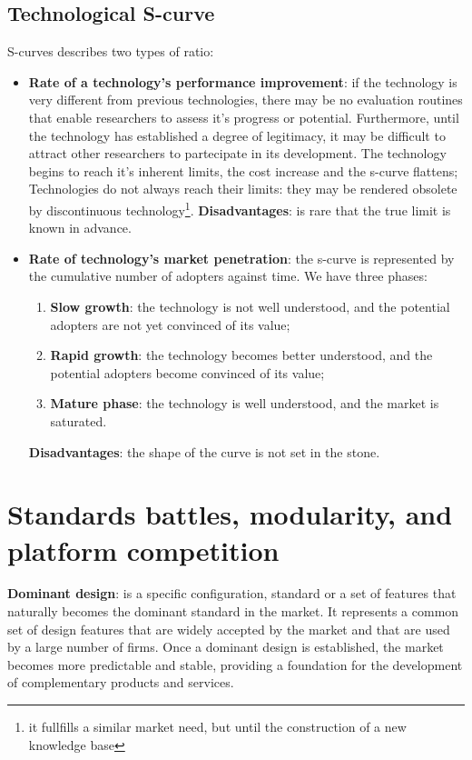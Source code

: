 \documentclass[12pt]{article}
\begin{document}
\subsection{Technological S-curve}
S-curves describes two types of ratio:
\begin{itemize}
    \item \textbf{Rate of a technology's performance improvement}: if the technology is very different from previous technologies, there may be no evaluation routines that enable researchers 
    to assess it's progress or potential. Furthermore, until the technology has established a degree of legitimacy, it may be difficult to attract other researchers to partecipate in its development.
    The technology begins to reach it's inherent limits, the cost increase and the s-curve flattens;
    Technologies do not always reach their limits: they may be rendered obsolete by discontinuous technology\footnote{it fullfills a similar market need, 
    but until the construction of a new knowledge base}.
    \textbf{Disadvantages}: is rare that the true limit is known in advance.
    \item \textbf{Rate of technology's market penetration}: the s-curve is represented by the cumulative number of adopters against time.
    We have three phases:
    \begin{enumerate}
        \item \textbf{Slow growth}: the technology is not well understood, and the potential adopters are not yet convinced of its value;
        \item \textbf{Rapid growth}: the technology becomes better understood, and the potential adopters become convinced of its value;
        \item \textbf{Mature phase}: the technology is well understood, and the market is saturated.
    \end{enumerate}
    \textbf{Disadvantages}: the shape of the curve is not set in the stone.
\end{itemize}
\section{Standards battles, modularity, and platform competition}
\textbf{Dominant design}: is a specific configuration, standard or a set of features that naturally becomes the dominant standard in the market.
It represents a common set of design features that are widely accepted by the market and that are used by a large number of firms.
Once a dominant design is established, the market becomes more predictable and stable, providing a foundation for the development of complementary products and services.
\end{document}
